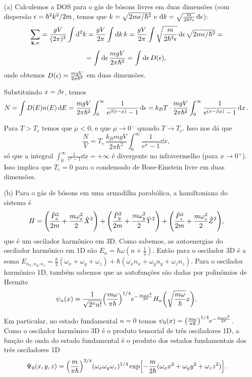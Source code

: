 \documentclass[a4paper,10pt]{article}
\begin{document}
(a) Calculemos a DOS para o gás de bósons livres em duas dimensões (com dispersão $\epsilon = \hbar^2 k^2 / 2m$, temos que
$k = \sqrt{2m\epsilon/\hbar^2}$ e $\dd{k} = \sqrt{\frac{m}{2\hbar^2\epsilon}} \dd{\epsilon}$):
$$
\sum_{\vb{k}, \sigma} = \frac{g V}{(2\pi)^2} \int \dd[2] k = \frac{gV}{2\pi} \int \dd{k} k =
\frac{gV}{2\pi} \int \sqrt{\frac{m}{2\hbar^2\epsilon}} \dd{\epsilon} \sqrt{2m\epsilon/\hbar^2} =
$$
$$
= \int \dd{\epsilon} \frac{mgV}{2\pi \hbar^2} = \int \dd{\epsilon} D(\epsilon),
$$
onde obtemos $D(\epsilon) = \frac{mgV}{2\pi \hbar^2}$ em duas dimensões.

\n

Substituindo $x = \beta \epsilon$, temos
$$
N = \int D(E) n(E) \dd{E} = \frac{m g V}{2\pi \hbar^2} \int_0^{\infty} \frac{1}{e^{\beta (\epsilon-\mu)} - 1} \dd{\epsilon} =
k_B T \cdot \frac{m g V}{2\pi \hbar^2} \int_0^{\infty} \frac{1}{e^{(x - \beta\mu)} - 1} \dd{x}.
$$

\n

Para $T > T_c$ temos que $\mu < 0$, e que $\mu \to 0^-$ quando $T \to T_c$. Isso nos dá que
$$
\frac{N}{V} = T_c \, \frac{k_B m g V}{2\pi \hbar^2} \int_0^{\infty} \frac{1}{e^{x} - 1} \dd{x},
$$
só que a integral $\int_0^{\infty} \frac{1}{e^{x} - 1} \dd{x} = +\infty$ é divergente no infravermelho (para $x \to 0^+$). Isso implica que $\boxed{T_c = 0}$ para o condensado de Bose-Einstein livre em duas dimensões.

\n

(b) Para o gás de bósons em uma armadilha parabólica, a hamiltoniana do sistema é
$$
H = \qty(\frac{\hat{P}_x^2}{2m} + \frac{m \omega_x^2}{2} \hat{X}^2) +
\qty(\frac{\hat{P}_y^2}{2m} + \frac{m \omega_y^2}{2} \hat{Y}^2) +
\qty(\frac{\hat{P}_z^2}{2m} + \frac{m \omega_z^2}{2} \hat{Z}^2),
$$
que é um oscilador harmônico em 3D. Como sabemos, as autoenergias do oscilador harmônico em 1D são $E_n = \hbar\omega(n+\frac{1}{2})$. Então para o oscilador 3D é a soma $E_{n_x, n_y, n_z} = \frac{\hbar}{2} (\omega_x + \omega_y + \omega_z) + \hbar(\omega_x n_x + \omega_y n_y + \omega_z n_z)$. Para o oscilador harmônico 1D, também sabemos que as autofunções são dadas por polinômios de Hermite
$$
\psi_n(x) = \frac{1}{\sqrt{2^n n!}} \qty(\frac{m\omega}{\pi\hbar})^{1/4} e^{-\frac{m\omega x^2}{2\hbar}}
H_n\qty(\sqrt{\frac{m\omega}{\hbar}} x).
$$

Em particular, no estado fundamental $n = 0$ temos $\psi_0(x) = \qty(\frac{m\omega}{\pi\hbar})^{1/4} e^{-\frac{m\omega x^2}{2\hbar}}$. Como o oscilador harmônico 3D é o produto tensorial de três osciladores 1D, a função de onda do estado fundamental é o produto dos estados fundamentais dos três osciladores 1D
$$
\Psi_0(x,y,z) =
\qty(\frac{m}{\pi\hbar})^{3/4}
(\omega_x \omega_y \omega_z)^{1/4}
\exp[-\frac{m}{2\hbar} (\omega_x x^2 + \omega_y y^2 + \omega_z z^2)].
$$
\end{document}
